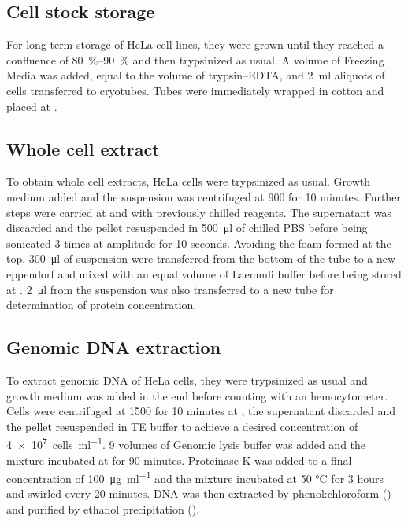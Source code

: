     \subsection{Cell stock storage}
      For long-term storage of HeLa cell lines, they were grown until
      they reached a confluence of \SIrange{80}{90}{\percent} and then
      trypsinized as usual. A volume of Freezing Media was added, equal
      to the volume of trypsin--EDTA, and \SI{2}{\ml} aliquots of
      cells transferred to cryotubes. Tubes were immediately wrapped in
      cotton and placed at .

    \subsection{Whole cell extract}
      \label{sec:cell-extract}
      To obtain whole cell extracts, HeLa cells were trypsinized as usual. Growth
      medium added and the suspension was centrifuged at \SI{900}{\gn}
      for 10 minutes. Further steps were carried at  and with previously
      chilled reagents. The supernatant was discarded and the pellet
      resuspended in \SI{500}{\ul} of chilled PBS before being
      sonicated 3 times at  amplitude for 10 seconds. Avoiding the
      foam formed at the top, \SI{300}{\ul} of suspension were transferred
      from the bottom of the tube to a new eppendorf and mixed with an equal
      volume of Laemmli buffer before being stored at .
      \SI{2}{\ul} from the suspension was also transferred to a new tube
      for determination of protein concentration.

    \subsection{Genomic DNA extraction}
      To extract genomic DNA of HeLa cells, they were trypsinized as usual and
      growth medium was added in the end before counting with an hemocytometer.
      Cells were centrifuged at \SI{1500}{\gn} for 10 minutes at , the
      supernatant discarded and the pellet resuspended in TE buffer to achieve
      a desired concentration of \SI{4e7}{cells\per\ml}. 9 volumes of
      Genomic lysis buffer was added and the mixture incubated at  for
      90 minutes. Proteinase K was added to a final concentration of
      \SI{100}{\ug\per\ml} and the mixture incubated at 50 °C for 3 hours and
      swirled every 20 minutes. DNA was then extracted by
      phenol:chloroform () and purified by ethanol
      precipitation ().

